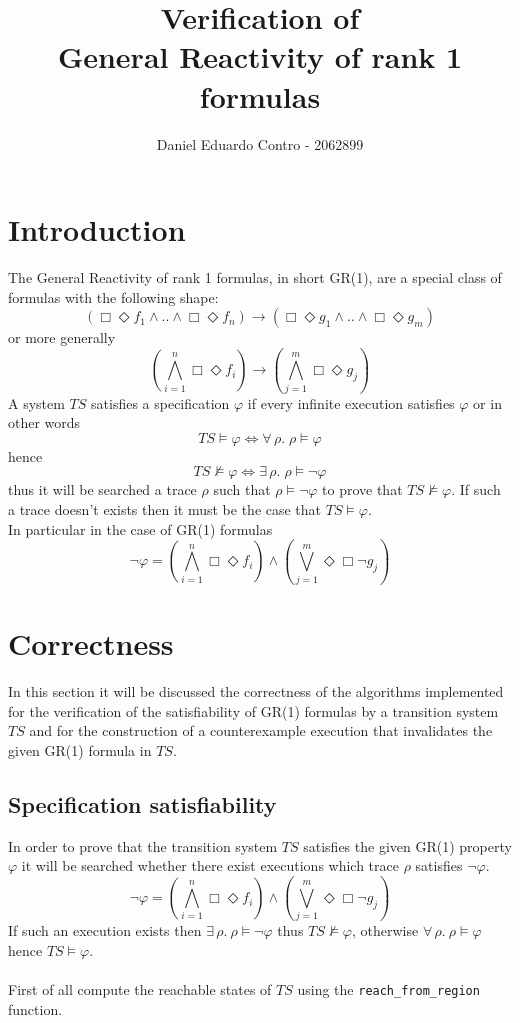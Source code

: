 \documentclass[11pt]{article}
\title{Verification of \\ General Reactivity of rank 1 formulas}
\author{Daniel Eduardo Contro - 2062899}
\date{}
\newcommand{\minline}[1]{{\footnotesize \texttt{#1}}}
\begin{document}
\maketitle

\section{Introduction}

The General Reactivity of rank 1 formulas, in short GR(1), are a special class
of formulas with the following shape:
\[
	(\Box\Diamond f_1 \wedge .. \wedge \Box\Diamond f_n) \to
	(\Box\Diamond g_1 \wedge .. \wedge \Box\Diamond g_m)
\]
or more generally
\[
	\left(\bigwedge_{i = 1}^n\Box\Diamond f_i \right) \to
	\left(\bigwedge_{j = 1}^m\Box\Diamond g_j \right)
\]
A system $TS$ satisfies a specification $\varphi$ if every infinite execution
satisfies $\varphi$ or in other words
\[
	TS \vDash \varphi \Leftrightarrow \forall\, \rho.\; \rho \vDash \varphi
\]
hence
\[
	TS \nvDash \varphi \Leftrightarrow \exists\, \rho.\; \rho \vDash \neg\varphi
\]
thus it will be searched a trace $\rho$ such that $\rho \vDash \neg\varphi$
to prove that $TS \nvDash \varphi$.
If such a trace doesn't exists then it must be the case that
$TS \vDash \varphi$.\\
In particular in the case of GR(1) formulas
\[
	\neg\varphi =
	\left(\bigwedge_{i = 1}^n\Box\Diamond f_i \right) \wedge
	\left(\bigvee_{j = 1}^m\Diamond\Box \neg g_j \right)
\]
\section{Correctness}

In this section it will be discussed the correctness of the algorithms
implemented for the verification of the satisfiability of GR(1) formulas by a
transition system $TS$ and for the construction of a counterexample execution
that invalidates the given GR(1) formula in $TS$.

\subsection{Specification satisfiability}

In order to prove that the transition system $TS$ satisfies the given GR(1)
property $\varphi$ it will be searched whether there exist executions which
trace $\rho$ satisfies $\neg\varphi$.
\[
	\neg\varphi = \left(\bigwedge_{i = 1}^n\Box\Diamond f_i \right) \wedge
	\left( \bigvee_{j = 1}^m\Diamond\Box \neg g_j \right)
\]
If such an execution exists then
$ \exists\, \rho.\ \rho \vDash \neg\varphi $
thus $TS \nvDash \varphi$, otherwise
$ \forall\, \rho.\ \rho \vDash \varphi $
hence $TS \vDash \varphi$.
\\ \\
First of all compute the reachable states of $TS$ using the
\minline{reach_from_region} function.
\end{document}
